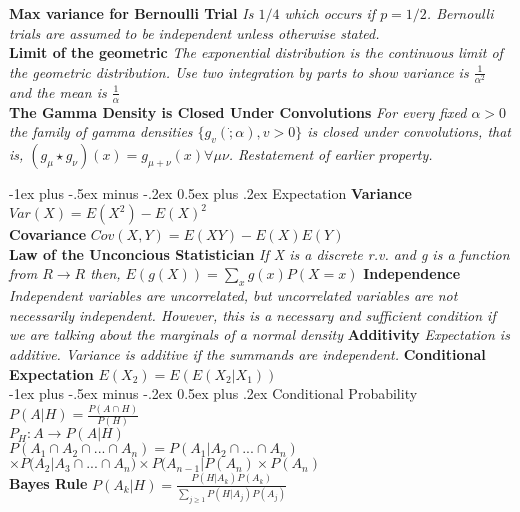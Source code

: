 \documentclass[10pt,landscape]{article}
\makeatletter
\renewcommand{\section}{\@startsection{section}{1}{0mm}%
                                {-1ex plus -.5ex minus -.2ex}%
                                {0.5ex plus .2ex}%
                                {\normalfont\large\bfseries}}
\makeatother
\begin{document}
\begin{multicols*}{3}
\textbf{Max variance for Bernoulli Trial} \textit{Is $1/4$ which occurs if $p=1/2$. Bernoulli trials are assumed to be independent unless otherwise stated.}\\
\textbf{Limit of the geometric} \textit{The exponential distribution is the continuous limit of the geometric distribution. Use two integration by parts to show variance is $\frac{1}{\alpha^2}$ and the mean is $\frac{1}{\alpha}$}\\
\textbf{The Gamma Density is Closed Under Convolutions} \textit{For every fixed $\alpha>0$ the family of gamma densities $\{g_v(\dot;\alpha), v>0\}$ is closed under convolutions, that is, $(g_\mu\star g_\nu)(x)=g_{\mu+\nu}(x) \forall\mu \nu$. Restatement of earlier property.}

\section{Expectation}
\textbf{Variance} $Var(X)=E(X^2)-E(X)^2$\\
\textbf{Covariance} $Cov(X,Y)=E(XY)- E(X)E(Y)$\\
\textbf{Law of the Unconcious Statistician}
 \textit{If X is a discrete r.v. and g is a function from {$R\rightarrow R$} then, $E(g(X))=\sum_{x}g(x)P(X=x)$}
\textbf{Independence} \textit{Independent variables are uncorrelated, but uncorrelated variables are not necessarily independent. However, this is a necessary and sufficient condition if we are talking about the marginals of a normal density}
\textbf{Additivity} \textit{Expectation is additive. Variance is additive if the summands are independent.}
\textbf{Conditional Expectation} \textit{$E(X_2)=E(E(X_2|X_1))$}\\


\section{Conditional Probability}
$P(A|H)=\frac{P(A \cap H)}{P(H)}$\\
$P_H: A \rightarrow P(A|H)$\\
$P(A_1 \cap A_2 \cap ... \cap A_n)= P(A_1|A_2 \cap ... \cap A_n)$\\ $\times P(A_2|A_3 \cap ... \cap A_n) \times P(A_{n-1}|P(A_n) \times P(A_n)$\\
\textbf{Bayes Rule}
$P(A_k|H)=\frac{P(H|A_k)P(A_k)}{\sum_{j \geq 1}{} P(H|A_j)P(A_j)}$

\end{multicols*}
\end{document}
